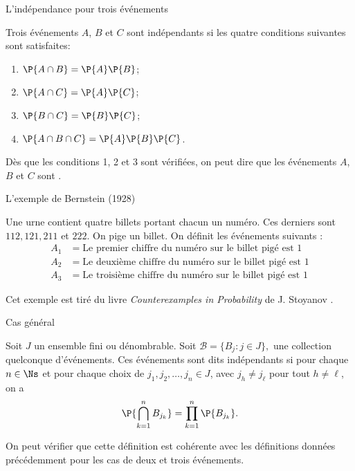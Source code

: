 \documentclass[nuit,charter,pied]{BeamerJS}
\begin{document}
\begin{frame}{L'indépendance pour trois événements}
\pause
	\begin{defn}{}{}
		Trois événements $A$, $B$ et $C$ sont indépendants si les quatre conditions suivantes sont satisfaites:\pause
		\begin{enumerate}
			\item $\P{A\cap B}=\P{A}\P{B}$;
			\item $\P{A\cap C}=\P{A}\P{C}$;
			\item $\P{B\cap C}=\P{B}\P{C}$;
			\item $\P{A\cap B\cap C}=\P{A}\P{B}\P{C}$.
		\end{enumerate}
	\end{defn}
	\pause
	\begin{rem}
	Dès que les conditions 1, 2 et 3 sont vérifiées, on peut dire que les événements $A$, $B$ et $C$ sont .
	\end{rem}
\end{frame}
\begin{frame}{L'exemple de Bernstein (1928)}
\pause
\begin{ex}
	Une urne contient quatre billets portant chacun un numéro. Ces derniers sont $112, 121, 211$ et $222$. On pige un billet. On définit les événements suivants :
	\begin{align*}
		A_1&=\text{Le premier chiffre du numéro sur le billet pigé est $1$}\\
		A_2&=\text{Le deuxième chiffre du numéro sur le billet pigé est $1$}\\
		A_3&=\text{Le troisième chiffre du numéro sur le billet pigé est $1$}
	\end{align*}
\end{ex}
\pause
\begin{rem}
   Cet exemple est tiré du livre \textit{Counterexamples in Probability} de J. Stoyanov \cite{stoyanov}.
\end{rem}
\end{frame}

\begin{frame}{Cas général}
\pause
	\begin{defn}{}{}
		Soit $J$ un ensemble fini ou dénombrable. Soit $\mathcal{B}=\{B_j:j\in J\},$ une collection quelconque d'événements. Ces événements sont dits indépendants si pour chaque $n\in\Ns$ et pour chaque choix de $j_1,j_2,\ldots,j_n\in J$, avec $j_h\neq j_{\ell}$ pour tout $h\neq \ell$, on a
		\[\P{\bigcap_{k=1}^n B_{j_k}}=\prod_{k=1}^n\P{B_{j_k}}.\]
	\end{defn}
	\pause
	\begin{rem}
	On peut vérifier que cette définition est cohérente avec les définitions données précédemment pour les cas de deux et trois événements.
	\end{rem}
\end{frame}
\end{document}
